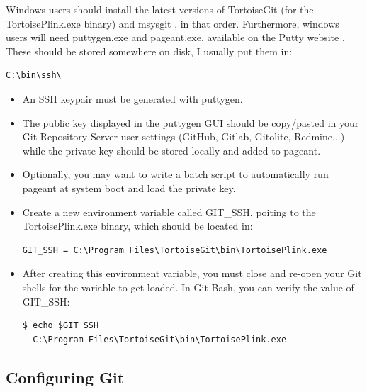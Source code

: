 \documentclass{../../common/tufte-latex/tufte-handout}
\begin{document}
Windows users should install the latest versions of TortoiseGit  (for the TortoisePlink.exe binary) and msysgit , in that order.
Furthermore, windows users will need puttygen.exe and pageant.exe, available on the Putty website . These should be stored somewhere on disk, I usually put them in:

\begin{lstlisting}[style=BashInputStyle]
  C:\bin\ssh\
\end{lstlisting}

\begin{itemize}

\item{An SSH keypair must be generated with puttygen.}
\item{The public key displayed in the puttygen GUI should be copy/pasted in your Git Repository Server user settings (GitHub, Gitlab, Gitolite, Redmine...) while the private key should be stored locally and added to pageant.} 
\item{Optionally, you may want to write a batch script to automatically run pageant at system boot and load the private key.}
\item{Create a new environment variable called GIT\_SSH, poiting to the TortoisePlink.exe binary, which should be located in:}

\begin{lstlisting}[style=BashInputStyle]
  GIT_SSH = C:\Program Files\TortoiseGit\bin\TortoisePlink.exe
\end{lstlisting}

\item{After creating this environment variable, you must close and re-open your Git shells for the variable to get loaded. In Git Bash, you can verify the value of GIT\_SSH:}

\begin{lstlisting}[style=BashInputStyle]
  $ echo $GIT_SSH
  C:\Program Files\TortoiseGit\bin\TortoisePlink.exe
\end{lstlisting}

\end{itemize}

\subsection{Configuring Git}
\end{document}
